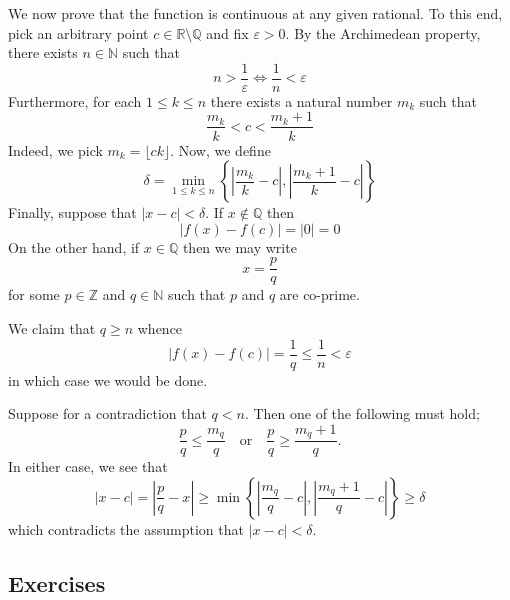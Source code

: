 \documentclass[12pt, reqno]{article}
\numberwithin{equation}{section}
\theoremstyle{definition}
\theoremstyle{remark}
\newcommand{\NN}{\mathbb{N}}
\newcommand{\QQ}{\mathbb{Q}}
\newcommand{\RR}{\mathbb{R}}
\newcommand{\ZZ}{\mathbb{Z}}
\newcommand{\set}[1]{\left\{#1\right\}}
\newcommand{\abs}[1]{\left\lvert#1\right\rvert}
\renewcommand{\epsilon}{\varepsilon}
\begin{document}
We now prove that the function is continuous at any given rational.
To this end, pick an arbitrary point $c\in\RR\setminus\QQ$ and fix $\epsilon>0$. By the Archimedean property, there exists $n\in \NN$ such that
\[
	n > \frac{1}{\epsilon} \iff \frac{1}{n} < \epsilon
\]
Furthermore, for each $1\leq k\leq n$ there exists a natural number $m_k$ such that
\[
	\frac{m_k}{k} < c < \frac{m_k+1}{k}
\]
Indeed, we pick $m_k = \lfloor ck \rfloor$. Now, we define
\[
	\delta = \min_{1\leq k \leq n}\set{\abs{\frac{m_k}{k} - c}, \abs{\frac{m_k+1}{k} - c}}
\]
Finally, suppose that $\abs{x-c} < \delta$. If $x\not\in\QQ$ then
\[
	\abs{f(x) - f(c)} = \abs{0} = 0
\]
On the other hand, if $x\in \QQ$ then we may write
\[
	x = \frac{p}{q}
\]
for some $p\in\ZZ$ and $q\in\NN$ such that $p$ and $q$ are co-prime.

We claim that $q\geq n$ whence
\[
	\abs{f(x) - f(c)} = \frac{1}{q} \leq \frac{1}{n} < \epsilon
\]
in which case we would be done.

Suppose for a contradiction that $q<n$. Then one of the following must hold;
\[
	\frac{p}{q} \leq \frac{m_q}{q}
	\quad\text{or}\quad
	\frac{p}{q} \geq \frac{m_q+1}{q}.
\]
In either case, we see that
\[
	\abs{x-c}
	= \abs{\frac{p}{q} - x}
	\geq \min\set{\abs{\frac{m_q}{q} - c}, \abs{\frac{m_q+1}{q} - c}} \geq \delta
\]
which contradicts the assumption that $\abs{x-c} < \delta$.

\subsection*{Exercises}
\end{document}
